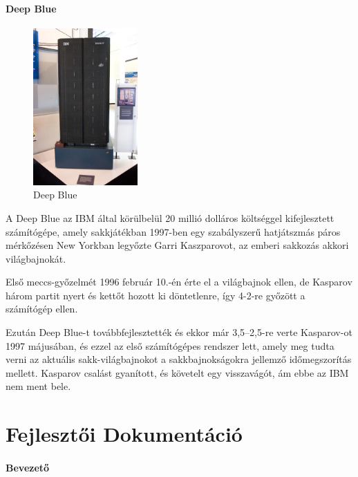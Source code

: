 \documentclass[twoside, a4paper, 12pt]{article}
\begin{document}
\subsection{Deep Blue}
\begin{figure}
	\caption{Deep Blue}
	\label{fig:deepblue}
	\includegraphics[width=4.0cm]{img/deepblue.jpg}
\end{figure}
A Deep Blue az IBM által körülbelül 20 millió dolláros költséggel kifejlesztett számítógépe, amely sakkjátékban 1997-ben egy szabályszerű hatjátszmás páros mérkőzésen New Yorkban legyőzte Garri Kaszparovot, az emberi sakkozás akkori világbajnokát.

Első meccs-győzelmét 1996 február 10.-én érte el a világbajnok ellen, de Kasparov három partit nyert és kettőt hozott ki döntetlenre, így 4-2-re győzött a számítógép ellen.

Ezután Deep Blue-t továbbfejlesztették és ekkor már 3,5–2,5-re verte Kasparov-ot 1997 májusában, és ezzel az első számítógépes rendszer lett, amely meg tudta verni az aktuális sakk-világbajnokot a sakkbajnokságokra jellemző időmegszorítás mellett. Kasparov csalást gyanított, és követelt egy visszavágót, ám ebbe az IBM nem ment bele. \cite{DeepBlueHu}\cite{DeepBlueEn}

\newpage
\part{Fejlesztői Dokumentáció}
\subsection{Bevezető}
\end{document}
